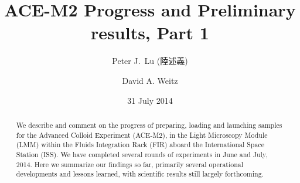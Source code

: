 \documentclass[
twocolumn,
rmp,aps]{revtex4-1}
\begin{document}
\begin{CJK*}{UTF8}{}

\title{ACE-M2 Progress and Preliminary results, Part 1}
\author{Peter J.~Lu (陸述義)}
\author{David A. Weitz}

\date{31 July 2014}
\begin{abstract}
We describe and comment on the progress of preparing, loading and launching
samples for the Advanced Colloid Experiment (ACE-M2), in the Light Microscopy
Module (LMM) within the Fluids Integration Rack (FIR) aboard the International
Space Station (ISS). We have completed several rounds of experiments in June and July,
2014. Here we summarize our findings so far, primarily several operational
developments and lessons learned, with scientific results still largely
forthcoming.
\end{abstract}
\maketitle
\end{CJK*}

\setcounter{tocdepth}{1} 
\tableofcontents

\clearpage












\end{document}
